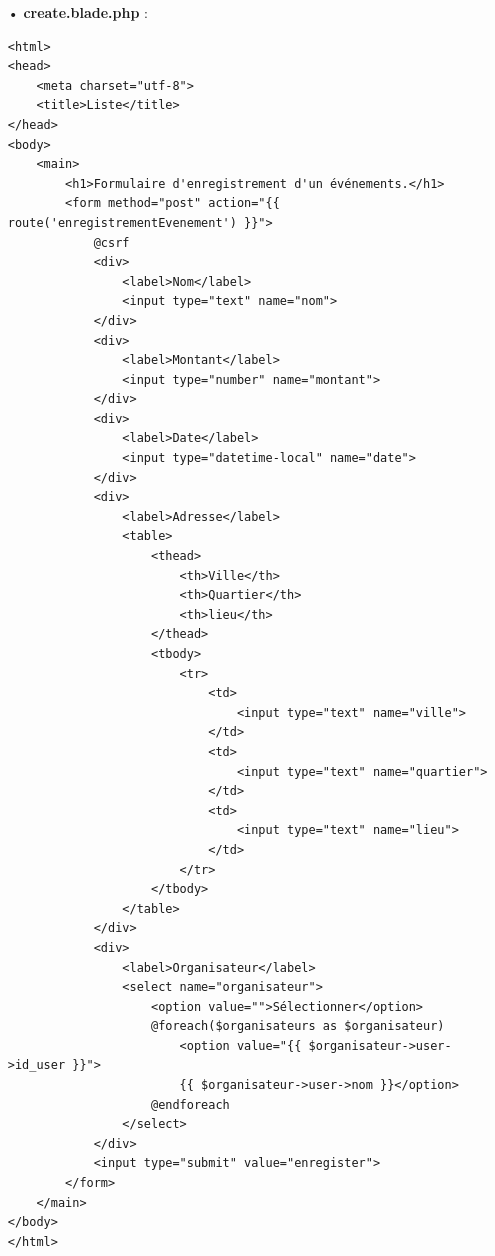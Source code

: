 \documentclass[12pt,a4paper]{article}
\begin{document}
\begin{itemize}
\item[•] \textbf{create.blade.php} :
\begin{verbatim}
<html>
<head>
    <meta charset="utf-8">
    <title>Liste</title>
</head>
<body>
    <main>
        <h1>Formulaire d'enregistrement d'un événements.</h1>
        <form method="post" action="{{ route('enregistrementEvenement') }}">
            @csrf
            <div>
                <label>Nom</label>
                <input type="text" name="nom">
            </div>
            <div>
                <label>Montant</label>
                <input type="number" name="montant">
            </div>
            <div>
                <label>Date</label>
                <input type="datetime-local" name="date">
            </div>
            <div>
                <label>Adresse</label>
                <table>
                    <thead>
                        <th>Ville</th>
                        <th>Quartier</th>
                        <th>lieu</th>
                    </thead>
                    <tbody>
                        <tr>
                            <td>
                                <input type="text" name="ville">
                            </td>
                            <td>
                                <input type="text" name="quartier">
                            </td>
                            <td>
                                <input type="text" name="lieu">
                            </td>
                        </tr>
                    </tbody>
                </table>
            </div>
            <div>
                <label>Organisateur</label>
                <select name="organisateur">
                    <option value="">Sélectionner</option>
                    @foreach($organisateurs as $organisateur)
                        <option value="{{ $organisateur->user->id_user }}">
                        {{ $organisateur->user->nom }}</option>
                    @endforeach
                </select>
            </div>
            <input type="submit" value="enregister">
        </form>
    </main>
</body>
</html>


\end{verbatim}
\end{itemize}
\end{document}
